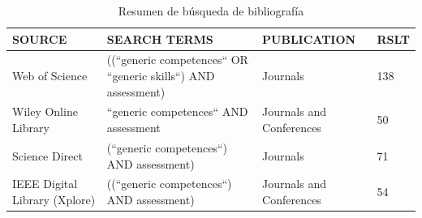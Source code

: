 
\begin{table}
  \begin{center}
  \begin{tabular}{| p{2.8cm} | p{5.5cm} | p{3cm} | p{0.8cm} |}
    \hline
    SOURCE & SEARCH TERMS & PUBLICATION & RSLT \\
    \hline
    \hline
    Web of Science & ((``generic competences`` OR ``generic skills``) AND assessment) & Journals & 138 \\
    \hline
    Wiley Online Library & ``generic competences`` AND assessment & Journals and Conferences & 50 \\
    \hline
    Science Direct & (``generic competences``) AND assessment) & Journals & 71 \\
    \hline
    IEEE Digital Library (Xplore) & ((``generic competences``) AND assessment) & Journals and Conferences & 54 \\
    \hline

    \hline
  \end{tabular}
\end{center}
\caption{Resumen de búsqueda de bibliografía}
\label{tab:ResumenBusqueda}
\end{table} 

